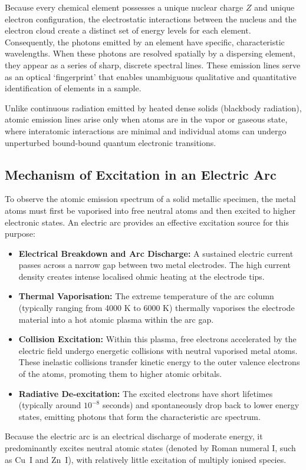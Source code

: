 \documentclass[12pt, a4paper]{article}
\begin{document}
Because every chemical element possesses a unique nuclear charge $Z$ and unique electron configuration, the electrostatic interactions between the nucleus and the electron cloud create a distinct set of energy levels for each element. Consequently, the photons emitted by an element have specific, characteristic wavelengths. When these photons are resolved spatially by a dispersing element, they appear as a series of sharp, discrete spectral lines. These emission lines serve as an optical `fingerprint' that enables unambiguous qualitative and quantitative identification of elements in a sample.

Unlike continuous radiation emitted by heated dense solids (blackbody radiation), atomic emission lines arise only when atoms are in the vapor or gaseous state, where interatomic interactions are minimal and individual atoms can undergo unperturbed bound-bound quantum electronic transitions.

\subsection{Mechanism of Excitation in an Electric Arc}
To observe the atomic emission spectrum of a solid metallic specimen, the metal atoms must first be vaporised into free neutral atoms and then excited to higher electronic states. An electric arc provides an effective excitation source for this purpose:
\begin{itemize}
    \item \textbf{Electrical Breakdown and Arc Discharge:} A sustained electric current passes across a narrow gap between two metal electrodes. The high current density creates intense localised ohmic heating at the electrode tips.
    \item \textbf{Thermal Vaporisation:} The extreme temperature of the arc column (typically ranging from 4000 K to 6000 K) thermally vaporises the electrode material into a hot atomic plasma within the arc gap.
    \item \textbf{Collision Excitation:} Within this plasma, free electrons accelerated by the electric field undergo energetic collisions with neutral vaporised metal atoms. These inelastic collisions transfer kinetic energy to the outer valence electrons of the atoms, promoting them to higher atomic orbitals.
    \item \textbf{Radiative De-excitation:} The excited electrons have short lifetimes (typically around $10^{-8}$ seconds) and spontaneously drop back to lower energy states, emitting photons that form the characteristic arc spectrum.
\end{itemize}
Because the electric arc is an electrical discharge of moderate energy, it predominantly excites neutral atomic states (denoted by Roman numeral I, such as Cu~I and Zn~I), with relatively little excitation of multiply ionised species.
\end{document}
